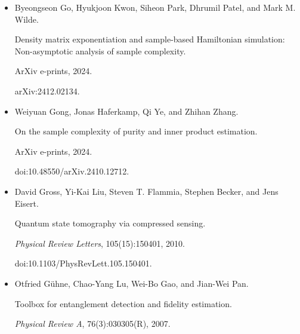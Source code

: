 \begin{itemize}
András Gilyén, Yuan Su, Guang Hao Low, and Nathan Wiebe.


Quantum singular value transformation and beyond: exponential
improvements for quantum matrix arithmetics.


In \emph{Proceedings of the 51st Annual ACM SIGACT Symposium on Theory
of Computing}, pages 193–204, 2019.


doi:10.1145/3313276.3316366.





\item[] 
[16]

Byeongseon Go, Hyukjoon Kwon, Siheon Park, Dhrumil Patel, and Mark M. Wilde.


Density matrix exponentiation and sample-based Hamiltonian
simulation: Non-asymptotic analysis of sample complexity.


ArXiv e-prints, 2024.


arXiv:2412.02134.





\item[] 
[17]

Weiyuan Gong, Jonas Haferkamp, Qi Ye, and Zhihan Zhang.


On the sample complexity of purity and inner product estimation.


ArXiv e-prints, 2024.


doi:10.48550/arXiv.2410.12712.





\item[] 
[18]

David Gross, Yi-Kai Liu, Steven T. Flammia, Stephen Becker, and Jens Eisert.


Quantum state tomography via compressed sensing.


\emph{Physical Review Letters}, 105(15):150401, 2010.


doi:10.1103/PhysRevLett.105.150401.





\item[] 
[19]

Otfried Gühne, Chao-Yang Lu, Wei-Bo Gao, and Jian-Wei Pan.


Toolbox for entanglement detection and fidelity estimation.


\emph{Physical Review A}, 76(3):030305(R), 2007.



\end{itemize}
